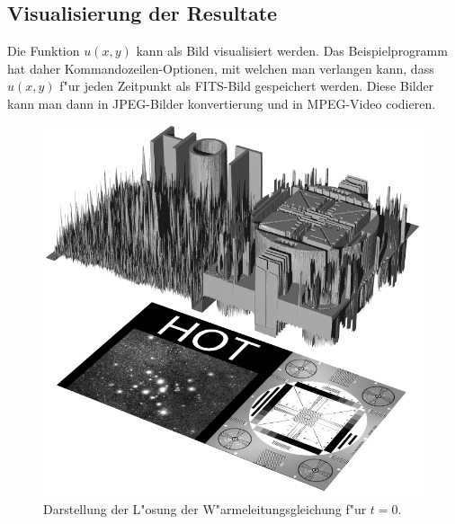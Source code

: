 \subsection{Visualisierung der Resultate}
Die Funktion $u(x,y)$ kann als Bild visualisiert werden.
Das Beispielprogramm hat daher Kommandozeilen-Optionen, mit welchen man
verlangen kann, dass $u(x,y)$ f"ur jeden Zeitpunkt als FITS-Bild
gespeichert werden. Diese Bilder kann man dann in JPEG-Bilder konvertierung
und in MPEG-Video codieren.
\begin{figure}
\begin{center}
\includegraphics[width=\hsize]{heat/heat-i00000.png}
\end{center}
\caption{Darstellung der L"osung der W"armeleitungsgleichung
f"ur $t=0$.
\label{heat:t0}}
\end{figure}
%
